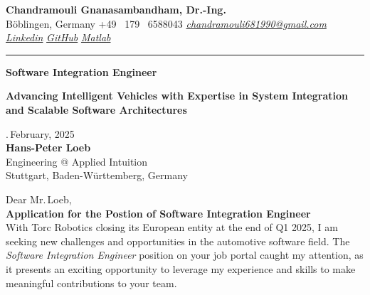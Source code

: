 \documentclass[a4paper,10pt]{article}
\newcommand{\link}[1]{{\textit{#1}}}
\begin{document}
\thispagestyle{plain}

\begin{center}
    {\Large \textbf{Chandramouli Gnanasambandham, Dr.-Ing.}}\\ 
    
    \vspace{0.2cm}
    \small B\"oblingen, Germany \hfill  \bullet  \hfill  +49 \ 179 \ 6588043 \hfill \bullet  \hfill
    \textup{\href{mailto:chandramouli681990@gmail.com}{\link{chandramouli681990@gmail.com}}} \hfill \bullet \hfill
    \textup{\href{https://www.linkedin.com/in/ganasambandhamc/}{\link{Linkedin}}} \hfill \bullet \hfill
    \textup{\href{https://github.com/chandramouli6890}{\link{GitHub}}} \hfill \bullet \hfill
    \textup{\href{https://de.mathworks.com/matlabcentral/profile/authors/4267772}{\link{Matlab}}}

    \vspace{-0.2cm}
    {\rule{\linewidth}{0.8pt}}

    \vspace{0.2cm}
    {\Large \textbf{Software Integration Engineer}}
    
    \vspace{0.1cm}
    \colorbox{gray!40}{%
        \parbox{0.99\textwidth}{%
            \centering \textcolor{highlightcolor}{\textbf{Advancing Intelligent Vehicles with Expertise in System Integration and Scalable Software Architectures}}
        }%
    }
\end{center}

\vspace{0.5cm}
.\,February, 2025\\

{\noindent
\textbf{Hans-Peter Loeb }\\
Engineering @ Applied Intuition\\
Stuttgart, Baden-Württemberg, Germany\\
}

\noindent Dear Mr.\,Loeb,\\

\noindent \textbf{Application for the Postion of Software Integration Engineer} \\

\noindent With Torc Robotics closing its European entity at the end of Q1 2025,
I am seeking new challenges and opportunities in the automotive software field.
The \textit{Software Integration Engineer} position on your job portal caught
my attention, as it presents an exciting opportunity to leverage my experience
and skills to make meaningful contributions to your team.\\
\end{document}
